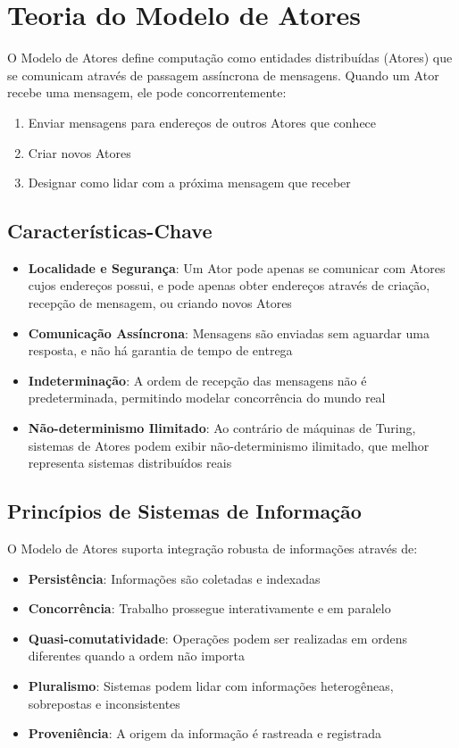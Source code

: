 \section{Teoria do Modelo de Atores}

O Modelo de Atores define computação como entidades distribuídas (Atores) que se comunicam através de passagem assíncrona de mensagens. Quando um Ator recebe uma mensagem, ele pode concorrentemente:

\begin{enumerate}
    \item Enviar mensagens para endereços de outros Atores que conhece
    \item Criar novos Atores
    \item Designar como lidar com a próxima mensagem que receber
\end{enumerate}

\subsection{Características-Chave}

\begin{itemize}
    \item \textbf{Localidade e Segurança}: Um Ator pode apenas se comunicar com Atores cujos endereços possui, e pode apenas obter endereços através de criação, recepção de mensagem, ou criando novos Atores
    \item \textbf{Comunicação Assíncrona}: Mensagens são enviadas sem aguardar uma resposta, e não há garantia de tempo de entrega
    \item \textbf{Indeterminação}: A ordem de recepção das mensagens não é predeterminada, permitindo modelar concorrência do mundo real
    \item \textbf{Não-determinismo Ilimitado}: Ao contrário de máquinas de Turing, sistemas de Atores podem exibir não-determinismo ilimitado, que melhor representa sistemas distribuídos reais
\end{itemize}

\subsection{Princípios de Sistemas de Informação}

O Modelo de Atores suporta integração robusta de informações através de:

\begin{itemize}
    \item \textbf{Persistência}: Informações são coletadas e indexadas
    \item \textbf{Concorrência}: Trabalho prossegue interativamente e em paralelo
    \item \textbf{Quasi-comutatividade}: Operações podem ser realizadas em ordens diferentes quando a ordem não importa
    \item \textbf{Pluralismo}: Sistemas podem lidar com informações heterogêneas, sobrepostas e inconsistentes
    \item \textbf{Proveniência}: A origem da informação é rastreada e registrada
\end{itemize}
